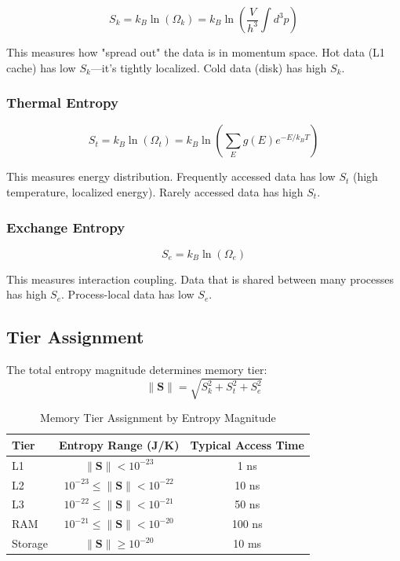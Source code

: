 \documentclass[twocolumn,10pt]{article}
\theoremstyle{definition}
\theoremstyle{remark}
\newcommand{\Scoord}{\mathbf{S}}
\begin{document}
\begin{equation}
    S_k = k_B \ln(\Omega_k) = k_B \ln\left(\frac{V}{h^3} \int d^3p\right)
\end{equation}

This measures how "spread out" the data is in momentum space. Hot data (L1 cache) has low $S_k$—it's tightly localized. Cold data (disk) has high $S_k$.

\subsubsection{Thermal Entropy}

\begin{equation}
    S_t = k_B \ln(\Omega_t) = k_B \ln\left(\sum_E g(E) e^{-E/k_B T}\right)
\end{equation}

This measures energy distribution. Frequently accessed data has low $S_t$ (high temperature, localized energy). Rarely accessed data has high $S_t$.

\subsubsection{Exchange Entropy}

\begin{equation}
    S_e = k_B \ln(\Omega_e)
\end{equation}

This measures interaction coupling. Data that is shared between many processes has high $S_e$. Process-local data has low $S_e$.

\subsection{Tier Assignment}

The total entropy magnitude determines memory tier:
\begin{equation}
    \|\Scoord\| = \sqrt{S_k^2 + S_t^2 + S_e^2}
\end{equation}

\begin{table}[h]
\centering
\caption{Memory Tier Assignment by Entropy Magnitude}
\begin{tabular}{lcc}
\toprule
Tier & Entropy Range (J/K) & Typical Access Time \\
\midrule
L1 & $\|\Scoord\| < 10^{-23}$ & 1 ns \\
L2 & $10^{-23} \leq \|\Scoord\| < 10^{-22}$ & 10 ns \\
L3 & $10^{-22} \leq \|\Scoord\| < 10^{-21}$ & 50 ns \\
RAM & $10^{-21} \leq \|\Scoord\| < 10^{-20}$ & 100 ns \\
Storage & $\|\Scoord\| \geq 10^{-20}$ & 10 ms \\
\bottomrule
\end{tabular}
\end{table}
\end{document}
